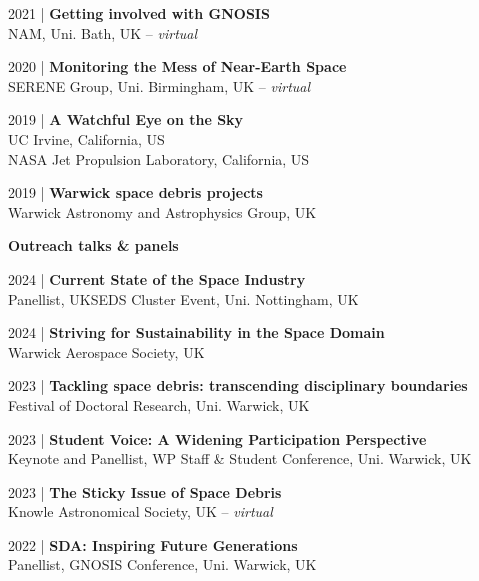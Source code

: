 \documentclass[10pt,a4paper]{altacv}
\begin{document}
\smallskip

\small 2021 | \textbf{Getting involved with GNOSIS} \\
NAM, Uni. Bath, UK -- \textit{virtual}

\smallskip

\small 2020 | \textbf{Monitoring the Mess of Near-Earth Space} \\
SERENE Group, Uni. Birmingham, UK -- \textit{virtual}

\smallskip

\small 2019 | \textbf{A Watchful Eye on the Sky} \\
UC Irvine, California, US \\
NASA Jet Propulsion Laboratory, California, US 

\smallskip

\small 2019 | \textbf{Warwick space debris projects} \\
Warwick Astronomy and Astrophysics Group, UK

\divider

\normalsize \textbf{Outreach talks \& panels}

\medskip

\small 2024 | \textbf{Current State of the Space Industry} \\
Panellist, UKSEDS Cluster Event, Uni. Nottingham, UK 

\smallskip

\small 2024 | \textbf{Striving for Sustainability in the Space Domain} \\
Warwick Aerospace Society, UK

\smallskip

\small 2023 | \textbf{Tackling space debris: transcending disciplinary boundaries} \\
Festival of Doctoral Research, Uni. Warwick, UK

\smallskip

\small 2023 | \textbf{Student Voice: A Widening Participation Perspective} \\
Keynote and Panellist, WP Staff \& Student Conference, Uni. Warwick, UK

\smallskip

\small 2023 | \textbf{The Sticky Issue of Space Debris} \\
Knowle Astronomical Society, UK -- \textit{virtual}

\smallskip

\small 2022 | \textbf{SDA: Inspiring Future Generations} \\
Panellist, GNOSIS Conference, Uni. Warwick, UK
\end{document}
